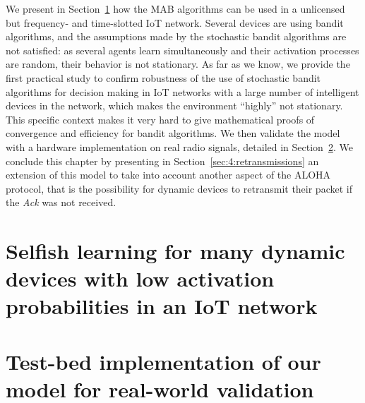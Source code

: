 We present in Section~\ref{sec:4:firstModel} how the MAB algorithms can be used in a unlicensed but frequency- and time-slotted IoT network.
Several devices are using bandit algorithms, and the assumptions made by the stochastic bandit algorithms are not satisfied: as several agents learn simultaneously and their activation processes are random, their behavior is not stationary.
As far as we know, we provide the first practical study to confirm robustness of the use of stochastic bandit algorithms for decision making in IoT networks with a large number of intelligent devices in the network, which makes the environment ``highly'' not stationary.
This specific context makes it very hard to give mathematical proofs of  convergence and efficiency for bandit algorithms.
We then validate the model with a hardware implementation on real radio signals, detailed in Section~\ref{sec:4:gnuradio}.
%
We conclude this chapter by presenting in Section~\ref{sec:4:retransmissions} an extension of this model to take into account another aspect of the ALOHA protocol, that is the possibility for dynamic devices to retransmit their packet if the \emph{Ack} was not received.


\section[Selfish learning for many dynamic devices in an IoT network]{Selfish learning for many dynamic devices with low activation probabilities in an IoT network}
\label{sec:4:firstModel}





\section{Test-bed implementation of our model for real-world validation}
\label{sec:4:gnuradio}


